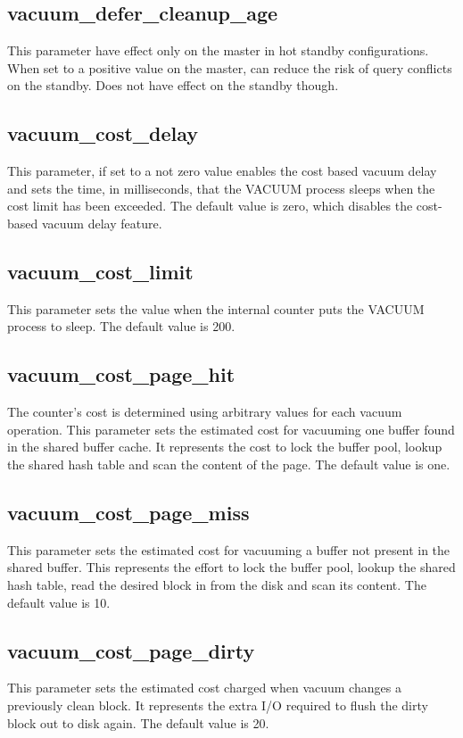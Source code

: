 \subsection{vacuum\_defer\_cleanup\_age}
This parameter have effect only on the master in hot standby configurations. When set to a positive  
value on the master, can reduce the risk of query conflicts on the standby. Does not have 
effect on the standby though.


\subsection{vacuum\_cost\_delay}\label{sub:VACUUMCOST}
This parameter, if set to a not zero value enables the cost based vacuum delay and sets the time, in milliseconds, that the VACUUM process sleeps when the cost limit 
has been exceeded. The default value is zero, which disables the cost-based vacuum delay feature. 

\subsection{vacuum\_cost\_limit}
This parameter sets the value when the internal counter puts the VACUUM process to sleep. The 
default value is 200. 


\subsection{vacuum\_cost\_page\_hit}
The counter's cost is determined using arbitrary values for each vacuum operation. This parameter 
sets the estimated cost for vacuuming one buffer found in the shared buffer cache. It represents 
the cost to lock the buffer pool, lookup the shared hash table and scan the content of the page. The 
default value is one.

\subsection{vacuum\_cost\_page\_miss}
This parameter sets the estimated cost for vacuuming a buffer not present in the shared buffer. This 
represents the effort to lock the buffer pool, lookup the shared hash table, read the desired block 
in from the disk and scan its content. The default value is 10.

\subsection{vacuum\_cost\_page\_dirty}
This parameter sets the estimated cost charged when vacuum changes a previously clean block. It 
represents the extra I/O required to flush the dirty block out to disk again. The default value is 
20.

